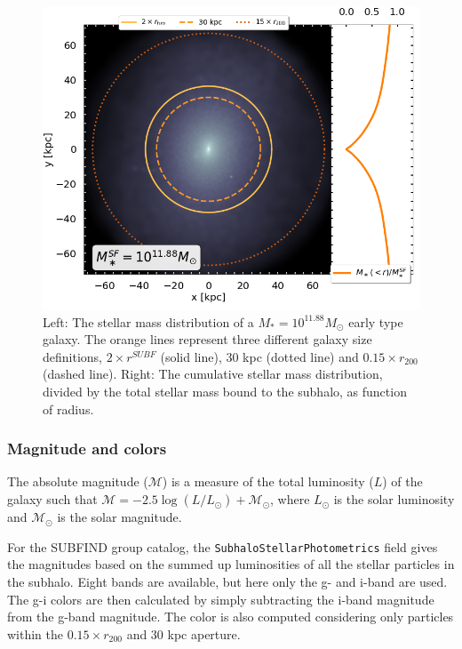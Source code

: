 \begin{figure}
    \centering
    \includegraphics[width=1\textwidth]{images/galaxy_size_big.png}
    \caption{Left: The stellar mass distribution of a $M_\ast = 10^{11.88} M_\odot$ early type galaxy. The orange lines represent three different galaxy size definitions, $2 \times r^{SUBF}$ (solid line), 30 kpc (dotted line) and $0.15 \times r_{200}$ (dashed line).
    Right: The cumulative stellar mass distribution, divided by the total stellar mass bound to the subhalo, as function of radius.
    }
    \label{gal_size_big}
\end{figure}


\subsubsection{Magnitude and colors}

The absolute magnitude ($\mathcal{M}$) is a measure of the total luminosity ($L$) of the galaxy such that $\mathcal{M} = -2.5 \log(L/L_\odot) + \mathcal{M}_\odot$, where $L_\odot$ is the solar luminosity and $\mathcal{M}_\odot$ is the solar magnitude.

For the SUBFIND group catalog, the \texttt{SubhaloStellarPhotometrics} field gives the magnitudes based on the summed up luminosities of all the stellar particles in the subhalo. Eight bands are available, but here only the g- and i-band are used. The g-i colors are then calculated by simply subtracting the i-band magnitude from the g-band magnitude. The color is also computed considering only particles within the $0.15 \times r_{200}$ and 30 kpc aperture.

